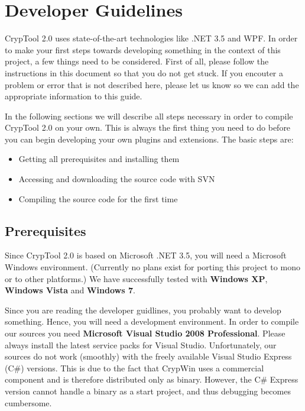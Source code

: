 \chapter{Developer Guidelines}
\label{DeveloperGuidelines}

CrypTool 2.0 uses state-of-the-art technologies like .NET 3.5 and WPF. In order to make your first steps towards developing something in the context of this project, a few things need to be considered. First of all, please follow the instructions in this document so that you do not get stuck. If you encouter a problem or error that is not described here, please let us know so we can add the appropriate information to this guide.

In the following sections we will describe all steps necessary in order to compile CrypTool 2.0 on your own. This is always the first thing you need to do before you can begin developing your own plugins and extensions. The basic steps are:
\begin{itemize}
	\item Getting all prerequisites and installing them
	\item Accessing and downloading the source code with SVN
	\item Compiling the source code for the first time
\end{itemize}

\section{Prerequisites}
\label{Prerequisites}

Since CrypTool 2.0 is based on Microsoft .NET 3.5, you will need a Microsoft Windows environment. (Currently no plans exist for porting this project to mono or to other platforms.) We have successfully tested with \textbf{Windows XP}, \textbf{Windows Vista} and \textbf{Windows 7}.

Since you are reading the developer guidlines, you probably want to develop something. Hence, you will need a development environment. In order to compile our sources you need \textbf{Microsoft Visual Studio 2008 Professional}. Please always install the latest service packs for Visual Studio. Unfortunately, our sources do not work (smoothly) with the freely available Visual Studio Express (C\#) versions. This is due to the fact that CrypWin uses a commercial component and is therefore distributed only as binary. However, the C\# Express version cannot handle a binary as a start project, and thus debugging becomes cumbersome.

